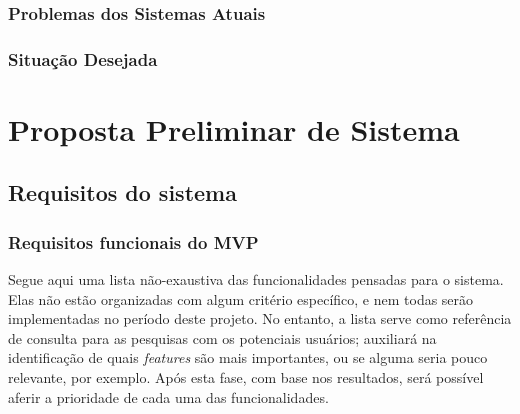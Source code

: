 \documentclass[12pt,a4paper,twoside,hyphens,english,brazil]{abntex2}
\begin{document}
\subsection{Problemas dos Sistemas Atuais}

\subsection{Situação Desejada}

\chapter{Proposta Preliminar de Sistema}


\section{Requisitos do sistema}
\label{sec:requisitos}


\subsection{Requisitos funcionais do MVP}

Segue aqui uma lista não-exaustiva das funcionalidades pensadas para o sistema. Elas não estão organizadas com algum critério específico, e nem todas serão implementadas no período deste projeto. No entanto, a lista serve como referência de consulta para as pesquisas com os potenciais usuários; auxiliará na identificação de quais \emph{features} são mais importantes, ou se alguma seria pouco relevante, por exemplo. Após esta fase, com base nos resultados, será possível aferir a prioridade de cada uma das funcionalidades.
\end{document}

